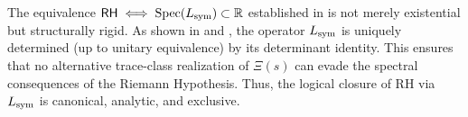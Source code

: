 \begin{remark}
\label{rem:canonical_uniqueness_logical_closure}
The equivalence \(\mathsf{RH} \iff \operatorname{Spec}(L_{\mathrm{sym}}) \subset \mathbb{R}\) established in  is not merely existential but structurally rigid. As shown in  and , the operator \( L_{\mathrm{sym}} \) is uniquely determined (up to unitary equivalence) by its determinant identity. This ensures that no alternative trace-class realization of \( \Xi(s) \) can evade the spectral consequences of the Riemann Hypothesis. Thus, the logical closure of RH via \( L_{\mathrm{sym}} \) is canonical, analytic, and exclusive.
\end{remark}

